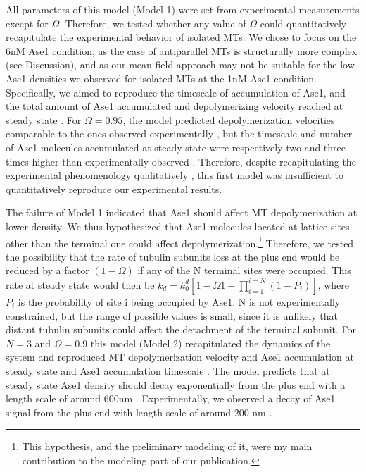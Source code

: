 All parameters of this model (Model 1) were set from experimental measurements except for $\Omega$. Therefore, we tested whether any value of $\Omega$ could quantitatively recapitulate the experimental behavior of isolated MTs. We chose to focus on the 6nM Ase1 condition, as the case of antiparallel MTs is structurally more complex (see Discussion), and as our mean field approach may not be suitable for the low Ase1 densities we observed for isolated MTs at the 1nM Ase1 condition. Specifically, we aimed to reproduce the timescale of accumulation of Ase1, and the total amount of Ase1 accumulated and depolymerizing velocity reached at steady state . For $\Omega=0.95$, the model predicted depolymerization velocities comparable to the ones observed experimentally , but the timescale and number of Ase1 molecules accumulated at steady state were respectively two and three times higher than experimentally observed . Therefore, despite recapitulating the experimental phenomenology qualitatively , this first model was insufficient to quantitatively reproduce our experimental results.\par

The failure of Model 1 indicated that Ase1 should affect MT depolymerization at lower density. We thus hypothesized that Ase1 molecules located at lattice sites other than the terminal one could affect depolymerization.\footnote{This hypothesis, and the preliminary modeling of it, were my main contribution to the modeling part of our publication.} Therefore, we tested the possibility that the rate of tubulin subunits loss at the plus end would be reduced by a factor $(1-\Omega)$ if any of the N terminal sites were occupied. This rate at steady state would then be $k_d=k_0^d [1-\Omega{1-\prod_{i=1}^{i=N}(1-P_i)}]$, where $P_i$ is the probability of site i being occupied by Ase1. N is not experimentally constrained, but the range of possible values is small, since it is unlikely that distant tubulin subunits could affect the detachment of the terminal subunit. For $N=3$ and $\Omega=0.9$ this model (Model 2) recapitulated the dynamics of the system  and reproduced MT depolymerization velocity and Ase1 accumulation at steady state and Ase1 accumulation timescale . The model predicts that at steady state Ase1 density should decay exponentially from the plus end with a length scale of around 600nm . Experimentally, we observed a decay of Ase1 signal from the plus end with length scale of around 200 nm . \par

